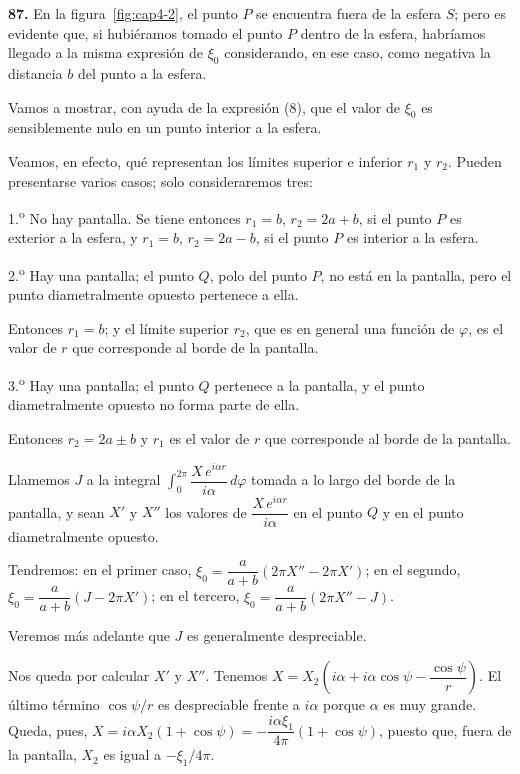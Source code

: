 \noindent\textbf{87.} En la figura~\ref{fig:cap4-2}, el punto $P$ se
encuentra fuera de la esfera $S$; pero es evidente que, si hubiéramos
tomado el punto $P$ dentro de la esfera, habríamos llegado a la misma
expresión de $\xi_0$ considerando, en ese caso, como negativa la distancia
$b$ del punto a la esfera.

Vamos a mostrar, con ayuda de la expresión (8), que el valor de $\xi_0$ es
sensiblemente nulo en un punto interior a la esfera.

Veamos, en efecto, qué representan los límites superior e inferior $r_1$
y $r_2$. Pueden presentarse varios casos; solo consideraremos tres:

1.\textsuperscript{o} No hay pantalla. Se tiene entonces $r_1=b$, $r_2=2a+b$, si el
punto $P$ es exterior a la esfera, y $r_1=b$, $r_2=2a-b$, si el punto $P$
es interior a la esfera.

2.\textsuperscript{o} Hay una pantalla; el punto $Q$, polo del punto $P$, no está en
la pantalla, pero el punto diametralmente opuesto pertenece a ella.

Entonces $r_1=b$; y el límite superior $r_2$, que es en general una
función de $\varphi$, es el valor de $r$ que corresponde al borde de la
pantalla.

3.\textsuperscript{o} Hay una pantalla; el punto $Q$ pertenece a la pantalla, y el
punto diametralmente opuesto no forma parte de ella.

Entonces $r_2=2a\pm b$ y $r_1$ es el valor de $r$ que corresponde al borde
de la pantalla.

Llamemos $J$ a la integral $\displaystyle\int_0^{2\pi}
\dfrac{X\,e^{i\alpha r}}{i\alpha}\,d\varphi$ tomada a lo largo del borde
de la pantalla, y sean $X'$ y $X''$ los valores de
$\dfrac{X\,e^{i\alpha r}}{i\alpha}$ en el punto $Q$ y en el punto
diametralmente opuesto.

Tendremos: en el primer caso,
$\xi_0=\dfrac{a}{a+b}(2\pi X''-2\pi X')$; en el segundo,
$\xi_0=\dfrac{a}{a+b}(J-2\pi X')$; en el tercero,
$\xi_0=\dfrac{a}{a+b}(2\pi X''-J)$.

Veremos más adelante que $J$ es generalmente despreciable.

Nos queda por calcular $X'$ y $X''$. Tenemos
$X=X_2\left(i\alpha+i\alpha\cos\psi-\dfrac{\cos\psi}{r}\right)$. El
último término $\cos\psi/r$ es despreciable frente a $i\alpha$ porque
$\alpha$ es muy grande. Queda, pues,
$X=i\alpha X_2(1+\cos\psi)=-\dfrac{i\alpha\xi_1}{4\pi}(1+\cos\psi)$,
puesto que, fuera de la pantalla, $X_2$ es igual a $-\xi_1/4\pi$.

